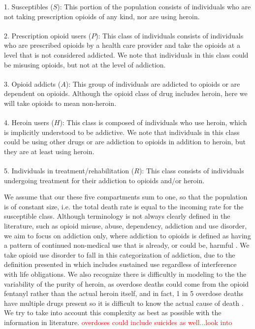 \documentclass[12pt]{article}
\begin{document}
1. Susceptibles ($S$): This portion of the population consists of individuals who are not taking prescription opioids of any kind, nor are using heroin. \\ \\
2. Prescription opioid users ($P$): This class of individuals consists of individuals who are prescribed opioids by a health care provider and take the opioids at a level that is not considered addicted. We note that individuals in this class could be misusing opioids, but not at the level of addiction.  \\ \\
3. Opioid addicts ($A$): This group of individuals are addicted to opioids or are dependent on opioids. Although the opioid class of drug includes heroin, here we will take opioids to mean non-heroin. \\ \\
4. Heroin users ($H$): This class is composed of individuals who use heroin, which is implicitly understood to be addictive. We note that individuals in this class could be using other drugs or are addiction to opioids in addition to heroin, but they are at least using heroin. \\ \\
5. Individuals in treatment/rehabilitation ($R$): This class consists of individuals undergoing treatment for their addiction to opioids and/or heroin. 

We assume that our these five compartments sum to one, so that the population is of constant size, i.e. the total death rate is equal to the incoming rate for the susceptible class. Although terminology is not always clearly defined in the literature, such as opioid misuse, abuse, dependency, addiction and use disorder, we aim to focus on addiction only, where addiction to opioids is defined as having a pattern of continued non-medical use that is already, or could be, harmful \cite{Vowles}. We take opioid use disorder to fall in this categorization of addiction, due to the definition presented in \cite{SAMSHA2} which includes sustained use regardless of interference with life obligations. We also recognize there is difficultly in modeling to the the variability of the purity of heroin, as overdose deaths could come from the opioid fentanyl rather than the actual heroin itself, and in fact, 1 in 5 overdose deaths have multiple drugs present so it is difficult to know the actual cause of death \cite{CDC4}. We try to take into account this complexity as best as possible with the information in literature. \textcolor{red}{overdoses could include suicides as well...look into}
\end{document}
